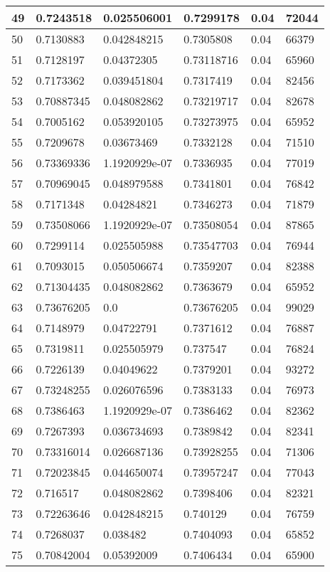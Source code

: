 \begin{longtable}{|l|l|l|l|l|l|}
49 & 0.7243518 & 0.025506001 & 0.7299178 & 0.04 & 72044 \\ \hline 
50 & 0.7130883 & 0.042848215 & 0.7305808 & 0.04 & 66379 \\ \hline 
51 & 0.7128197 & 0.04372305 & 0.73118716 & 0.04 & 65960 \\ \hline 
52 & 0.7173362 & 0.039451804 & 0.7317419 & 0.04 & 82456 \\ \hline 
53 & 0.70887345 & 0.048082862 & 0.73219717 & 0.04 & 82678 \\ \hline 
54 & 0.7005162 & 0.053920105 & 0.73273975 & 0.04 & 65952 \\ \hline 
55 & 0.7209678 & 0.03673469 & 0.7332128 & 0.04 & 71510 \\ \hline 
56 & 0.73369336 & 1.1920929e-07 & 0.7336935 & 0.04 & 77019 \\ \hline 
57 & 0.70969045 & 0.048979588 & 0.7341801 & 0.04 & 76842 \\ \hline 
58 & 0.7171348 & 0.04284821 & 0.7346273 & 0.04 & 71879 \\ \hline 
59 & 0.73508066 & 1.1920929e-07 & 0.73508054 & 0.04 & 87865 \\ \hline 
60 & 0.7299114 & 0.025505988 & 0.73547703 & 0.04 & 76944 \\ \hline 
61 & 0.7093015 & 0.050506674 & 0.7359207 & 0.04 & 82388 \\ \hline 
62 & 0.71304435 & 0.048082862 & 0.7363679 & 0.04 & 65952 \\ \hline 
63 & 0.73676205 & 0.0 & 0.73676205 & 0.04 & 99029 \\ \hline 
64 & 0.7148979 & 0.04722791 & 0.7371612 & 0.04 & 76887 \\ \hline 
65 & 0.7319811 & 0.025505979 & 0.737547 & 0.04 & 76824 \\ \hline 
66 & 0.7226139 & 0.04049622 & 0.7379201 & 0.04 & 93272 \\ \hline 
67 & 0.73248255 & 0.026076596 & 0.7383133 & 0.04 & 76973 \\ \hline 
68 & 0.7386463 & 1.1920929e-07 & 0.7386462 & 0.04 & 82362 \\ \hline 
69 & 0.7267393 & 0.036734693 & 0.7389842 & 0.04 & 82341 \\ \hline 
70 & 0.73316014 & 0.026687136 & 0.73928255 & 0.04 & 71306 \\ \hline 
71 & 0.72023845 & 0.044650074 & 0.73957247 & 0.04 & 77043 \\ \hline 
72 & 0.716517 & 0.048082862 & 0.7398406 & 0.04 & 82321 \\ \hline 
73 & 0.72263646 & 0.042848215 & 0.740129 & 0.04 & 76759 \\ \hline 
74 & 0.7268037 & 0.038482 & 0.7404093 & 0.04 & 65852 \\ \hline 
75 & 0.70842004 & 0.05392009 & 0.7406434 & 0.04 & 65900 \\ \hline 
\end{longtable}